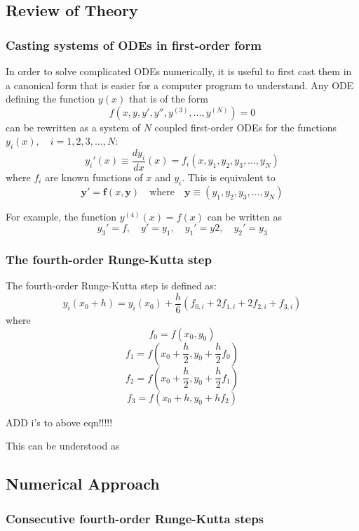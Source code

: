 \documentclass[10pt]{article}
\begin{document}
\subsection*{Review of Theory}

\subsubsection*{Casting systems of ODEs in first-order form}

In order to solve complicated ODEs numerically, it is useful to first cast them in a canonical form that 
is easier for a computer program to understand. Any ODE defining the function $y(x)$ that is of the form 
$$f(x, y, y', y'', y^{(3)}, \ldots,  y^{(N)}) = 0$$
can be rewritten as a system of $N$ coupled first-order ODEs for the functions 
$y_i(x), \quad i = 1, 2, 3, \ldots, N$:
$$y_i'(x) \equiv \frac{dy_i}{dx}(x) = f_i(x, y_1, y_2, y_3, \ldots, y_N)$$
where $f_i$ are known functions of $x$ and $y_i$. This is equivalent to 
$$\mathbf{y'} = \mathbf{f}(x, \mathbf{y}) \quad \textrm{where} \quad \mathbf{y} \equiv (y_1, y_2, y_3, 
\ldots, y_N)$$

For example, the function $y^{(4)}(x) = f(x)$ can be written as 
$$y_3' = f, \quad y' = y_1, \quad y_1' = y2, \quad y_2' = y_3$$

\subsubsection*{The fourth-order Runge-Kutta step}

The fourth-order Runge-Kutta step is defined as:
$$y_i(x_0 + h) = y_i(x_0) + \frac{h}{6} (f_{0,i} + 2f_{1,i} + 2f_{2,i} + f_{3,i})$$
where 
$$f_0 = f(x_0, y_0)$$
$$f_1 = f\left(x_0 + \frac{h}{2}, y_0 + \frac{h}{2} f_0\right)$$
$$f_2 = f\left(x_0 + \frac{h}{2}, y_0 + \frac{h}{2} f_1\right)$$
$$f_3 = f\left(x_0 + h, y_0 + h f_2\right)$$

ADD i's to above eqn!!!!!

This can be understood as 

\subsection*{Numerical Approach}

\subsubsection*{Consecutive fourth-order Runge-Kutta steps}
\end{document}
